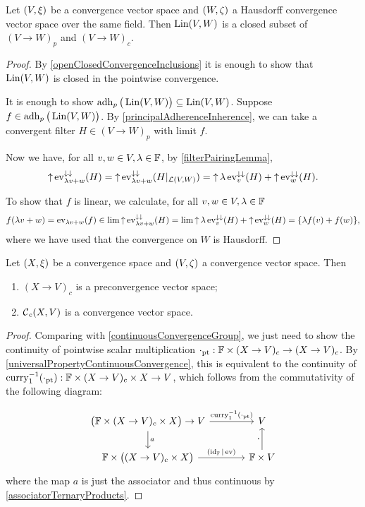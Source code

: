 \begin{lemma} \label{linearFunctionsClosedSubset}
Let $\sSet{V, \xi}$ be a convergence vector space and $\sSet{W, \zeta}$ a Hausdorff convergence vector space over the same field. Then $\operatorname{Lin}(V,W)$ is a closed subset of $(V\to W)_p$ and $(V\to W)_c$.
\end{lemma}
\begin{proof}
By \ref{openClosedConvergenceInclusions} it is enough to show that $\operatorname{Lin}(V,W)$ is closed in the pointwise convergence.

It is enough to show $\operatorname{adh}_p\big(\operatorname{Lin}(V,W)\big) \subseteq \operatorname{Lin}(V,W)$. Suppose $f\in \operatorname{adh}_p\big(\operatorname{Lin}(V,W)\big)$.  By \ref{principalAdherenceInherence}, we can take a convergent filter $H\in (V\to W)_p$ with limit $f$. 

Now we have, for all $v,w\in V, \lambda \in \mathbb{F}$, by \ref{filterPairingLemma},
\[ \operatorname{\uparrow}\operatorname{ev}_{\lambda v+w}^{\downarrow\downarrow}(H) = \operatorname{\uparrow}\operatorname{ev}_{\lambda v+w}^{\downarrow\downarrow}(H|_{\operatorname{\mathcal{L}}(V,W)}) = \operatorname{\uparrow}\lambda\operatorname{ev}_{v}^{\downarrow\downarrow}(H) + \operatorname{\uparrow}\operatorname{ev}_{w}^{\downarrow\downarrow}(H). \] 

To show that $f$ is linear, we calculate, for all $v,w\in V, \lambda \in \mathbb{F}$
\[ f(\lambda v + w) = \operatorname{ev}_{\lambda v+w}(f) \in \lim\operatorname{\uparrow}\operatorname{ev}_{\lambda v+w}^{\downarrow\downarrow}(H) = \lim \operatorname{\uparrow}\lambda\operatorname{ev}_{v}^{\downarrow\downarrow}(H) + \operatorname{\uparrow}\operatorname{ev}_{w}^{\downarrow\downarrow}(H) = \{\lambda f(v) + f(w)\},  \]
where we have used that the convergence on $W$ is Hausdorff.
\end{proof}

\begin{proposition} \label{continuousConvergenceVectorSpace}
Let $\sSet{X,\xi}$ be a convergence space and $\sSet{V, \zeta}$ a convergence vector space. Then
\begin{enumerate}
\item $(X\to V)_c$ is a preconvergence vector space;
\item $\operatorname{\mathcal{C}}_c(X,V)$ is a convergence vector space.
\end{enumerate}
\end{proposition}
\begin{proof}
Comparing with \ref{continuousConvergenceGroup}, we just need to show the continuity of pointwise scalar multiplication $\cdot_\text{pt}: \mathbb{F}\times (X\to V)_c \to (X\to V)_c$. By \ref{universalPropertyContinuousConvergence}, this is equivalent to the continuity of $\operatorname{curry}_1^{-1}(\cdot_\text{pt}): \mathbb{F}\times (X\to V)_c\times X \to V$, which follows from the commutativity of the following diagram:

\[ \begin{tikzcd}[column sep=large]
\big(\F\times (X\to V)_c\times X\big) \to V \arrow[r, "{\curry_1^{-1}(\cdot_\text{pt})}"] \arrow[d, "a"] & V \\
\F\times \big((X\to V)_c\times X\big) \arrow[r, "(\id_\F|\evalMap)"] & \F\times V \arrow[u, "{\boldsymbol{\cdot}}"]
\end{tikzcd} \]
where the map $a$ is just the associator and thus continuous by  \ref{associatorTernaryProducts}.
\end{proof}

